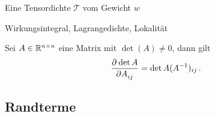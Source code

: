 \begin{definition}[Tensordichte]
Eine Tensordichte $\mathcal{T}$ vom Gewicht $w$
\end{definition}
Wirkungsintegral, Lagrangedichte, Lokalität
\begin{beispiel}
\end{beispiel}
\begin{lemma} 
Sei $A\in \mathbb{R}^{n\times n}$ eine Matrix mit $\det(A)\neq 0$, dann gilt 
\begin{equation}
\dpd{\det A}{A_{ij}}=\det A ({A^{-1}})_{ij}\,.
\end{equation}
\end{lemma}
\subsection{Randterme}
